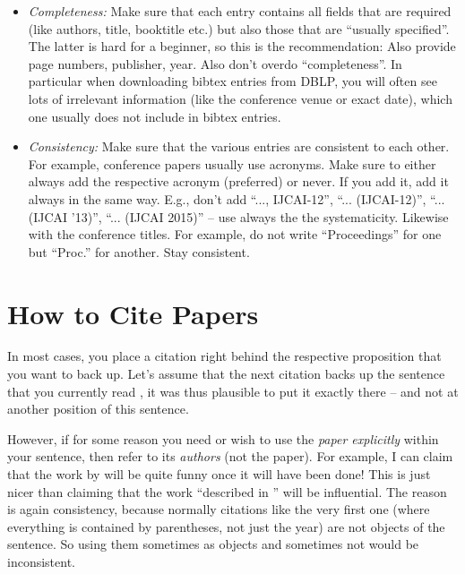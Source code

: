 \begin{itemize}
   
  \item \emph{Completeness:} Make sure that each entry contains all fields that are required (like authors, title, booktitle etc.) but also those that are ``usually specified''. The latter is hard for a beginner, so this is the recommendation: Also provide page numbers, publisher, year. Also don't overdo ``completeness''. In particular when downloading bibtex entries from DBLP, you will often see lots of irrelevant information (like the conference venue or exact date), which one usually does not include in bibtex entries.
  \item \emph{Consistency:} Make sure that the various entries are consistent to each other. For example, conference papers usually use acronyms. Make sure to either always add the respective acronym (preferred) or never. If you add it, add it always in the same way. E.g., don't add ``..., IJCAI-12'', ``... (IJCAI-12)'', ``... (IJCAI '13)'', ``... (IJCAI 2015)'' -- use always the the systematicity. Likewise with the conference titles. For example, do not write ``Proceedings'' for one but ``Proc.'' for another. Stay consistent.
\end{itemize}
    
    


\section{How to Cite Papers}

In most cases, you place a citation right behind the respective proposition that you want to back up. Let's assume that the next citation backs up the sentence that you currently read \citep{Smith2021Wubalubadubdub}, it was thus plausible to put it exactly there -- and not at another position of this sentence.

However, if for some reason you need or wish to use the \emph{paper explicitly} within your sentence, then refer to its \emph{authors} (not the paper). For example, I can claim that the work by \cite{Smith2021Wubalubadubdub} will be quite funny once it will have been done! This is just nicer than claiming that the work ``described in \citep{Smith2021Wubalubadubdub}'' will be influential. The reason is again consistency, because normally citations like the very first one (where everything is contained by parentheses, not just the year) are not objects of the sentence. So using them sometimes as objects and sometimes not would be inconsistent.
 
